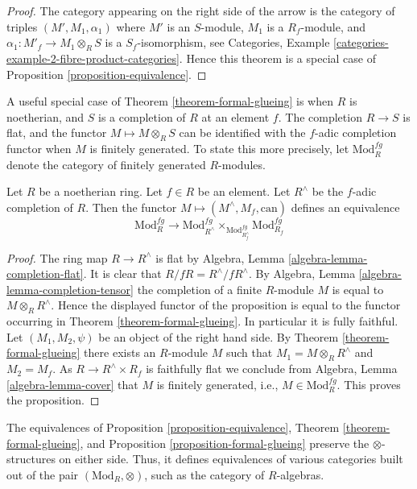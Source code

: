 \begin{proof}
The category appearing on the right side of the arrow
is the category of triples $(M', M_1, \alpha_1)$ where $M'$ is an
$S$-module, $M_1$ is a $R_f$-module, and
$\alpha_1 : M'_f \to M_1 \otimes_R S$ is a $S_f$-isomorphism, see
Categories, Example \ref{categories-example-2-fibre-product-categories}.
Hence this theorem is a special case of
Proposition \ref{proposition-equivalence}.
\end{proof}

\noindent
A useful special case of
Theorem \ref{theorem-formal-glueing}
is when $R$ is noetherian, and $S$ is a completion of $R$ at an
element $f$. The completion $R \to S$ is flat, and the functor
$M \mapsto M \otimes_R S$ can be identified with the $f$-adic
completion functor when $M$ is finitely generated. To state
this more precisely, let $\text{Mod}^{fg}_R$ denote the category
of finitely generated $R$-modules.

\begin{proposition}
\label{proposition-formal-glueing}
Let $R$ be a noetherian ring.
Let $f \in R$ be an element.
Let $R^\wedge$ be the $f$-adic completion of $R$.
Then the functor $M \mapsto (M^\wedge, M_f, \text{can})$
defines an equivalence
$$
\text{Mod}^{fg}_R
\longrightarrow
\text{Mod}^{fg}_{R^\wedge}
\times_{\text{Mod}^{fg}_{R^\wedge_f}}
\text{Mod}^{fg}_{R_f}
$$
\end{proposition}

\begin{proof}
The ring map $R \to R^\wedge$ is flat by
Algebra, Lemma \ref{algebra-lemma-completion-flat}.
It is clear that $R/fR = R^\wedge/fR^\wedge$.
By
Algebra, Lemma \ref{algebra-lemma-completion-tensor}
the completion of a finite $R$-module $M$ is equal to $M \otimes_R R^\wedge$.
Hence the displayed functor of the proposition is equal to the
functor occurring in
Theorem \ref{theorem-formal-glueing}.
In particular it is fully faithful. Let $(M_1, M_2, \psi)$ be an
object of the right hand side. By
Theorem \ref{theorem-formal-glueing}
there exists an $R$-module $M$ such that
$M_1 = M \otimes_R R^\wedge$ and $M_2 = M_f$. As $R \to R^\wedge \times R_f$
is faithfully flat we conclude from
Algebra, Lemma \ref{algebra-lemma-cover}
that $M$ is finitely generated, i.e., $M \in \text{Mod}^{fg}_R$.
This proves the proposition.
\end{proof}

\begin{remark}
\label{remark-formal-glueing-algebras}
The equivalences of
Proposition \ref{proposition-equivalence},
Theorem \ref{theorem-formal-glueing}, and
Proposition \ref{proposition-formal-glueing}
preserve the $\otimes$-structures on either side.
Thus, it defines equivalences of various categories
built out of the pair $(\text{Mod}_R, \otimes)$, such as the category of
$R$-algebras.
\end{remark}


